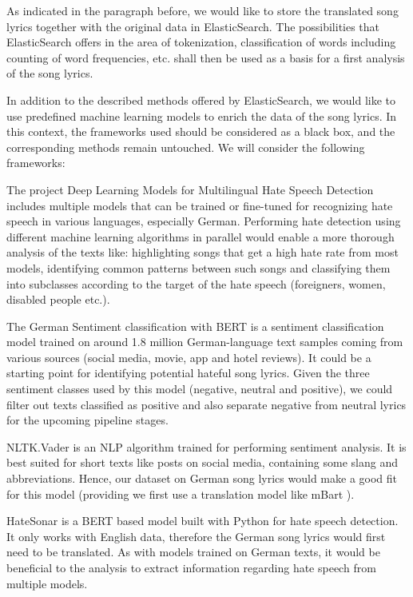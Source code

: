 As indicated in the paragraph before, we would like to store the translated song lyrics together with the original data in ElasticSearch. The possibilities that ElasticSearch offers in the area of tokenization, classification of words including counting of word frequencies, etc. shall then be used as a basis for a first analysis of the song lyrics.

In addition to the described methods offered by ElasticSearch, we would like to use predefined machine learning models to enrich the data of the song lyrics. In this context, the frameworks used should be considered as a black box, and the corresponding methods remain untouched. We will consider the following frameworks:

The project Deep Learning Models for Multilingual Hate Speech Detection \cite{deepMLhatespeech} includes multiple models that can be trained or fine-tuned for recognizing hate speech in various languages, especially German. Performing hate detection using different machine learning algorithms in parallel would enable a more thorough analysis of the texts like: highlighting songs that get a high hate rate from most models, identifying common patterns between such songs and classifying them into subclasses according to the target of the hate speech (foreigners, women, disabled people etc.).

The German Sentiment classification with BERT \cite{guhr2020training} is a sentiment classification model trained on around 1.8 million German-language text samples coming from various sources (social media, movie, app and hotel reviews). It could be a starting point for identifying potential hateful song lyrics. Given the three sentiment classes used by this model (negative, neutral and positive), we could filter out texts classified as positive and also separate negative from neutral lyrics for the upcoming pipeline stages.

NLTK.Vader \cite{vader} is an NLP algorithm trained for performing sentiment analysis. It is best suited for short texts like posts on social media, containing some slang and abbreviations. Hence, our dataset on German song lyrics would make a good fit for this model (providing we first use a translation model like mBart \cite{mBart}).

HateSonar \cite{davidson2017automated} is a BERT based model built with Python for hate speech detection. It only works with English data, therefore the German song lyrics would first need to be translated. As with models trained on German texts, it would be beneficial to the analysis to extract information regarding hate speech from multiple models.

